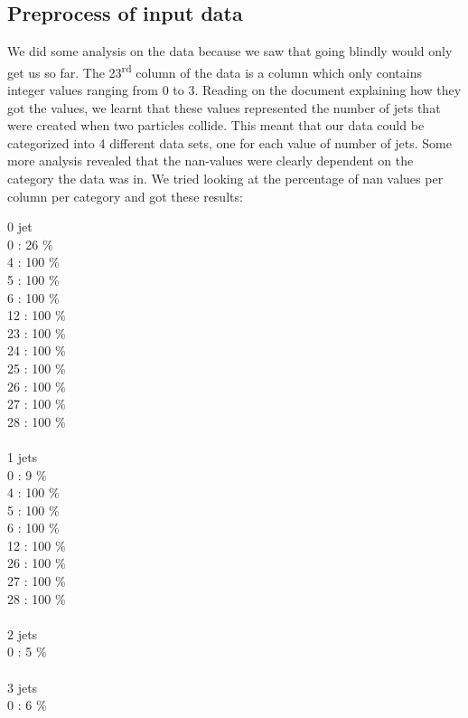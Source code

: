 \documentclass[10pt,conference,compsocconf]{IEEEtran}
\begin{document}
\subsection{Preprocess of input data}
We did some analysis on the data because we saw that going blindly would only get us so far. The 23\textsuperscript{rd} column of the data is a column which only contains integer values ranging from 0 to 3. Reading on the document explaining how they got the values, we learnt that these values represented the number of jets that were created when two particles collide. This meant that our data could be categorized into 4 different data sets, one for each value of number of jets. 
Some more analysis revealed that the nan-values were clearly dependent on the category the data was in. We tried looking at the percentage of nan values per column per category and got these results:\\

\begin{multicols}{4}
0 jet\\
    0 :  26 \%\\
    4 : 100 \%\\
    5 : 100 \%\\
    6 : 100 \%\\
   12 : 100 \%\\
   23 : 100 \%\\
   24 : 100 \%\\
   25 : 100 \%\\
   26 : 100 \%\\
   27 : 100 \%\\
   28 : 100 \%\\
\columnbreak
\\1 jets\\
    0 :   9 \%\\
    4 : 100 \%\\
    5 : 100 \%\\
    6 : 100 \%\\
   12 : 100 \%\\
   26 : 100 \%\\
   27 : 100 \%\\
   28 : 100 \%\\
\columnbreak
\\2 jets\\
    0 :   5 \%\\
\columnbreak
\\3 jets\\
    0 :   6 \%\\
\end{multicols}
\end{document}
